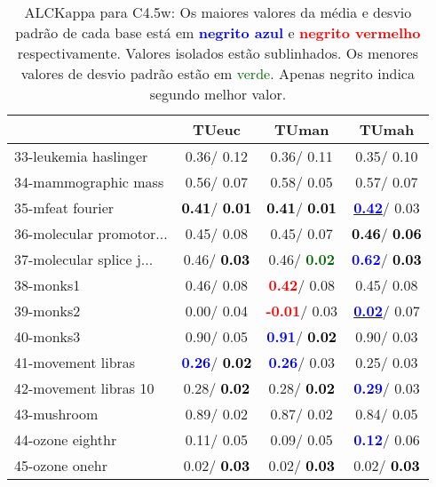 \begin{table}[h]
\caption{ALCKappa para C4.5w: Os maiores valores da média e desvio padrão de cada base está em \textcolor{blue}{\textbf{negrito azul}} e \textcolor{red}{\textbf{negrito vermelho}} respectivamente. Valores isolados estão sublinhados. Os menores valores de desvio padrão estão em \textcolor{darkgreen}{verde}. Apenas negrito indica segundo melhor valor.}
\begin{center}\begin{tabular}{lc|c|c}
 & TUeuc & TUman & TUmah\\ \hline 33-leukemia haslinger &   0.36/  0.12 &   0.36/  0.11 &   0.35/  0.10 \\
34-mammographic mass &   0.56/  0.07 &   0.58/  0.05 &   0.57/  0.07 \\
35-mfeat fourier & \textcolor{black}{\textbf{  0.41}}/\textcolor{black}{\textbf{  0.01}} & \textcolor{black}{\textbf{  0.41}}/\textcolor{black}{\textbf{  0.01}} & \underline{\textcolor{blue}{\textbf{  0.42}}}/  0.03 \\
36-molecular promotor... &   0.45/  0.08 &   0.45/  0.07 & \textcolor{black}{\textbf{  0.46}}/\textcolor{black}{\textbf{  0.06}} \\
37-molecular splice j... &   0.46/\textcolor{black}{\textbf{  0.03}} &   0.46/\textcolor{darkgreen}{\textbf{  0.02}} & \textcolor{blue}{\textbf{  0.62}}/\textcolor{black}{\textbf{  0.03}} \\
38-monks1 &   0.46/  0.08 & \textcolor{red}{\textbf{  0.42}}/  0.08 &   0.45/  0.08 \\
39-monks2 &   0.00/  0.04 & \textcolor{red}{\textbf{ -0.01}}/  0.03 & \underline{\textcolor{blue}{\textbf{  0.02}}}/  0.07 \\ \hline
40-monks3 &   0.90/  0.05 & \textcolor{blue}{\textbf{  0.91}}/\textcolor{black}{\textbf{  0.02}} &   0.90/  0.03 \\
41-movement libras & \textcolor{blue}{\textbf{  0.26}}/\textcolor{black}{\textbf{  0.02}} & \textcolor{blue}{\textbf{  0.26}}/  0.03 &   0.25/  0.03 \\
42-movement libras 10 &   0.28/\textcolor{black}{\textbf{  0.02}} &   0.28/\textcolor{black}{\textbf{  0.02}} & \textcolor{blue}{\textbf{  0.29}}/  0.03 \\
43-mushroom &   0.89/  0.02 &   0.87/  0.02 &   0.84/  0.05 \\
44-ozone eighthr &   0.11/  0.05 &   0.09/  0.05 & \textcolor{blue}{\textbf{  0.12}}/  0.06 \\
45-ozone onehr &   0.02/\textcolor{black}{\textbf{  0.03}} &   0.02/\textcolor{black}{\textbf{  0.03}} &   0.02/\textcolor{black}{\textbf{  0.03}} \\

\end{tabular}
\end{center}
\end{table}
